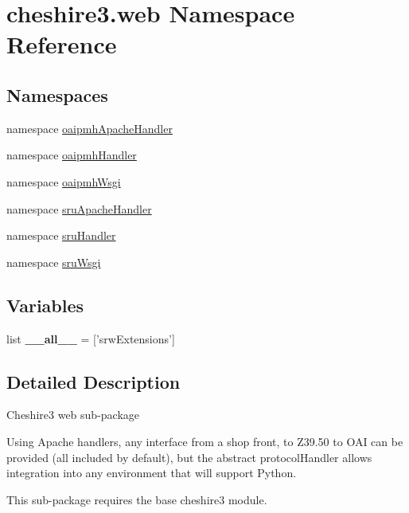 \hypertarget{namespacecheshire3_1_1web}{\section{cheshire3.\-web Namespace Reference}
\label{namespacecheshire3_1_1web}
}
\subsection*{Namespaces}
\begin{DoxyCompactItemize}
\item 
namespace \hyperlink{namespacecheshire3_1_1web_1_1oaipmh_apache_handler}{oaipmh\-Apache\-Handler}
\item 
namespace \hyperlink{namespacecheshire3_1_1web_1_1oaipmh_handler}{oaipmh\-Handler}
\item 
namespace \hyperlink{namespacecheshire3_1_1web_1_1oaipmh_wsgi}{oaipmh\-Wsgi}
\item 
namespace \hyperlink{namespacecheshire3_1_1web_1_1sru_apache_handler}{sru\-Apache\-Handler}
\item 
namespace \hyperlink{namespacecheshire3_1_1web_1_1sru_handler}{sru\-Handler}
\item 
namespace \hyperlink{namespacecheshire3_1_1web_1_1sru_wsgi}{sru\-Wsgi}
\end{DoxyCompactItemize}
\subsection*{Variables}
\begin{DoxyCompactItemize}
\item 
\hypertarget{namespacecheshire3_1_1web_ae4919a1470aa7951a8303004c3fe761e}{list {\bfseries \-\_\-\-\_\-all\-\_\-\-\_\-} = \mbox{[}'srw\-Extensions'\mbox{]}}\label{namespacecheshire3_1_1web_ae4919a1470aa7951a8303004c3fe761e}

\end{DoxyCompactItemize}


\subsection{Detailed Description}
\begin{DoxyVerb}Cheshire3 web sub-package

Using Apache handlers, any interface from a shop front, to Z39.50 to
OAI can be provided (all included by default), but the abstract
protocolHandler allows integration into any environment that will
support Python.

This sub-package requires the base cheshire3 module.
\end{DoxyVerb}
 